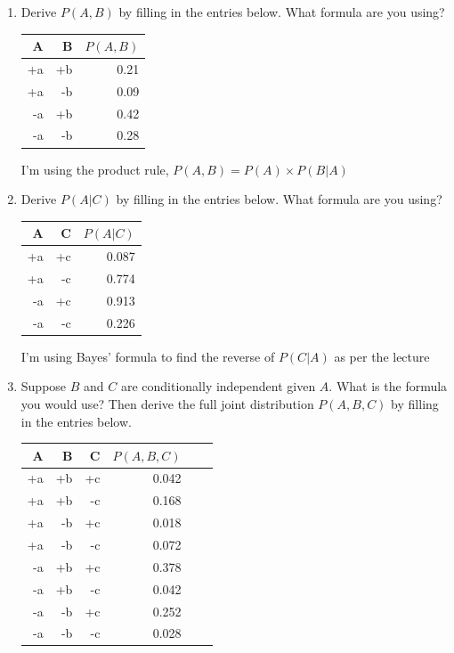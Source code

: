 \documentclass[12pt]{article}
\begin{document}
\begin{enumerate}

\item Derive $P(A,B)$ by filling in the entries below.  What formula are you using?

\begin{center}
\begin{tabular}{|r|r|r|} \hline
A  & B  & $P(A,B)$ \\ \hline
+a & +b &  0.21        \\ \hline
+a & -b &  0.09        \\ \hline
-a & +b &  0.42        \\ \hline
-a & -b &  0.28        \\ \hline
\end{tabular}
\end{center}

I'm using the product rule, $P(A,B) = P(A) \times P(B|A)$

\item Derive $P(A|C)$ by filling in the entries below.  What formula are you using?

\begin{center}
\begin{tabular}{|r|r|r|} \hline
A  & C  & $P(A|C)$ \\ \hline
+a & +c & 0.087         \\ \hline
+a & -c & 0.774         \\ \hline
-a & +c & 0.913         \\ \hline
-a & -c & 0.226         \\ \hline
\end{tabular}
\end{center}

I'm using Bayes' formula to find the reverse of $P(C|A)$ as per the lecture

\item Suppose $B$ and $C$ are conditionally independent given $A$.
  What is the formula you would use?  Then derive the full joint
  distribution $P(A,B,C)$ by filling in the entries below.

\begin{center}
\begin{tabular}{|r|r|r|r|l|l|} \hline
A  & B  & C  & $P(A,B,C)$ \\ \hline
+a & +b & +c & 0.042           \\ \hline
+a & +b & -c & 0.168           \\ \hline
+a & -b & +c & 0.018           \\ \hline
+a & -b & -c & 0.072           \\ \hline
-a & +b & +c & 0.378           \\ \hline
-a & +b & -c & 0.042           \\ \hline
-a & -b & +c & 0.252           \\ \hline
-a & -b & -c & 0.028           \\ \hline
\end{tabular}
\end{center}


\end{enumerate}
\end{document}
